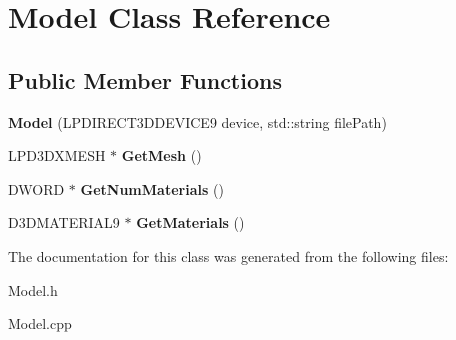 \hypertarget{class_model}{\section{Model Class Reference}
\label{class_model}
}
\subsection*{Public Member Functions}
\begin{DoxyCompactItemize}
\item 
\hypertarget{class_model_ac35e999b6f0bb309a07e69d984d54f91}{{\bfseries Model} (L\-P\-D\-I\-R\-E\-C\-T3\-D\-D\-E\-V\-I\-C\-E9 device, std\-::string file\-Path)}\label{class_model_ac35e999b6f0bb309a07e69d984d54f91}

\item 
\hypertarget{class_model_a6d8965212d9f56d91ed49b3a0f518797}{L\-P\-D3\-D\-X\-M\-E\-S\-H $\ast$ {\bfseries Get\-Mesh} ()}\label{class_model_a6d8965212d9f56d91ed49b3a0f518797}

\item 
\hypertarget{class_model_adfbcd9f63be2d4807bde68f5fe2feece}{D\-W\-O\-R\-D $\ast$ {\bfseries Get\-Num\-Materials} ()}\label{class_model_adfbcd9f63be2d4807bde68f5fe2feece}

\item 
\hypertarget{class_model_a0d48fb22c0b82943d313d7f9ca3e434e}{D3\-D\-M\-A\-T\-E\-R\-I\-A\-L9 $\ast$ {\bfseries Get\-Materials} ()}\label{class_model_a0d48fb22c0b82943d313d7f9ca3e434e}

\end{DoxyCompactItemize}


The documentation for this class was generated from the following files\-:\begin{DoxyCompactItemize}
\item 
Model.\-h\item 
Model.\-cpp\end{DoxyCompactItemize}

